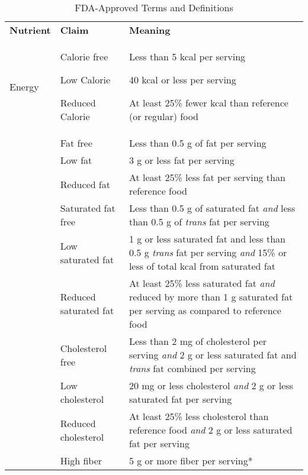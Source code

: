 \documentclass[title={Chapter 2}]{fdsn201notes}
\begin{document}
\begin{table}[H]
	\centering
	\begin{threeparttable}
		\caption{FDA-Approved Terms and Definitions	}
		\label{tab:fda-approved-terms-and-definitions}
		\begin{tabular}{p{} p{} p{}}
			\rowcolor{rowdarkgreen}\textbf{Nutrient} & \textbf{Claim} & \textbf{Meaning}\\
			\rowcolor{rowlightgreen}Energy & Calorie free

			Low Calorie

			Reduced Calorie & Less than 5 kcal per serving

			40 kcal or less per serving

			At least 25\% fewer kcal than reference (or regular) food\\
			\rowcolor{rowmedgreen} & Fat free & Less than 0.5 g of fat per serving\\
			\rowcolor{rowmedgreen} & Low fat & 3 g or less fat per serving\\
			\rowcolor{rowmedgreen} & Reduced fat & At least 25\% less fat per serving than reference food\\
			\rowcolor{rowmedgreen} & Saturated fat free & Less than 0.5 g of saturated fat \emph{and} less than 0.5 g of \emph{trans} fat per serving\\
			\rowcolor{rowmedgreen} & Low saturated fat & 1 g or less saturated fat and less than 0.5 g \emph{trans} fat per serving \emph{and} 15\% or less of total kcal from saturated fat\\
			\rowcolor{rowmedgreen} & Reduced saturated fat & At least 25\% less saturated fat \emph{and} reduced by more than 1 g saturated fat per serving as compared to reference food\\
			\rowcolor{rowmedgreen} & Cholesterol free & Less than 2 mg of cholesterol per serving \emph{and} 2 g or less saturated fat and \emph{trans} fat combined per serving\\
			\rowcolor{rowmedgreen} & Low cholesterol & 20 mg or less cholesterol \emph{and} 2 g or less saturated fat per serving\\
			\rowcolor{rowmedgreen} \multirow[t]{-9}{0.11\textwidth}{Fat and Cholesterol} & Reduced cholesterol & At least 25\% less cholesterol than reference food \emph{and} 2 g or less saturated fat per serving\\
			\rowcolor{rowlightgreen} & High fiber & 5 g or more fiber per serving* \\

\end{tabular}
\end{threeparttable}
\end{table}
\end{document}

